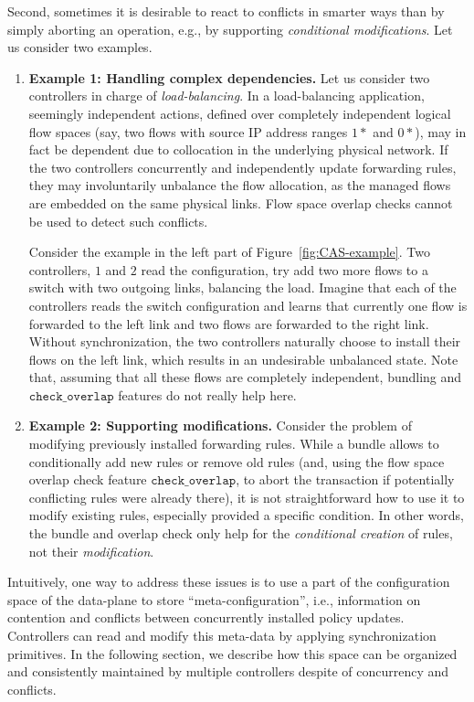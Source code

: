 \documentclass[conference]{sigcomm-alternate}
\newcommand{\checko}{\texttt{check\_overlap}\xspace}
\newcommand{\petr}[1]{\textit{\textcolor{blue}{[petr]: #1}}} %
\begin{document}
Second, sometimes it is desirable to react to conflicts in smarter ways than
by simply aborting an operation, e.g., by supporting \emph{conditional modifications}.
Let us consider two examples.

\begin{enumerate}
\item \textbf{Example 1: Handling complex dependencies.} Let us consider two controllers
in charge
of \emph{load-balancing}.
In a load-balancing application, seemingly independent actions, defined over
completely independent logical flow spaces (say, two flows with source IP address ranges $1*$ and $0*$),
may in fact be dependent due to collocation in the underlying physical network.
If the two controllers concurrently and independently
update forwarding rules,
they may involuntarily
unbalance the flow allocation, as the managed flows are embedded
on the same physical links.
Flow space overlap checks cannot be used to detect
such conflicts.

Consider the example in the left part of Figure~\ref{fig:CAS-example}. Two controllers,
$1$ and $2$ read the configuration, try add two more flows to a switch
with two outgoing links, balancing the load.  
Imagine that each of the controllers reads the switch configuration and
learns that currently one flow is forwarded to the left link and two
flows are forwarded to the right link.
Without synchronization, the two controllers naturally choose to
install their flows on the left link, which results in an undesirable
unbalanced state. Note that, assuming that all these flows are
completely independent, bundling and $\checko$ features do not really
help here.  


\item \textbf{Example 2: Supporting modifications.} 
Consider the problem of modifying previously installed forwarding rules.
While a bundle allows to conditionally add new rules or remove
old rules (and, using the flow space overlap
check feature $\checko$, to abort the transaction if potentially conflicting
rules were already there), it is not straightforward how to use it to  
modify existing rules, especially provided a specific condition.
In other words, the bundle and overlap check only help
for the \emph{conditional creation} of rules, not their \emph{modification}.
\end{enumerate}


Intuitively, one way to address these issues is to use a part of the
configuration space of the data-plane to store 
``meta-configuration'', i.e., information on contention and conflicts between
concurrently installed policy updates. Controllers can read and modify
this meta-data by applying synchronization primitives. 
In the following section, we
describe how this space can be organized and consistently maintained
by multiple controllers despite of concurrency and conflicts.    
\end{document}
